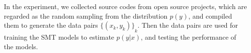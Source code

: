 \documentclass[senior,final,11pt]{iscs-thesis}
\newcommand{\argmax}{\mathop{\rm arg\,max}\limits}
\begin{document}
In the experiment, we collected source codes from open source projects, which are regarded as the random sampling from the distribution $ p(y) $, 
and compiled them to generate the data pairs $ {\{(x_k,y_k)\}}_k $.
Then the data pairs are used for training the SMT models to estimate $p(y|x)$, and testing the performance of the models.




\end{document}

